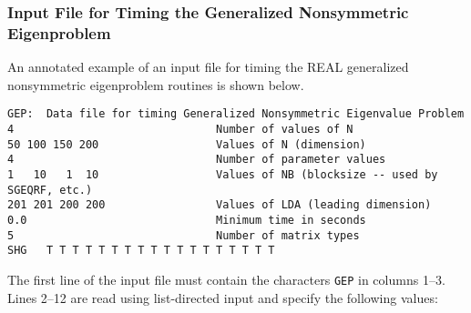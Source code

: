 \subsubsection{Input File for Timing the Generalized Nonsymmetric Eigenproblem}

\dent

An annotated example of an input file for timing the
REAL generalized nonsymmetric eigenproblem routines is shown below.

%
%
\begin{verbatim}
GEP:  Data file for timing Generalized Nonsymmetric Eigenvalue Problem 
4                               Number of values of N
50 100 150 200                  Values of N (dimension)
4                               Number of parameter values
1   10   1  10                  Values of NB (blocksize -- used by SGEQRF, etc.)
201 201 200 200                 Values of LDA (leading dimension)
0.0                             Minimum time in seconds
5                               Number of matrix types
SHG   T T T T T T T T T T T T T T T T T T
\end{verbatim}

The first line of the input file 
must contain the characters {\tt GEP} in columns 1--3.
Lines 2--12 are read using list-directed input and specify the following
values:


